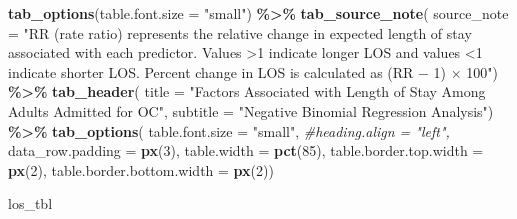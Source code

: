 \documentclass[
]{article}
\newenvironment{Shaded}{\begin{snugshade}}{\end{snugshade}}
\newcommand{\AttributeTok}[1]{\textcolor[rgb]{0.13,0.29,0.53}{#1}}
\newcommand{\CommentTok}[1]{\textcolor[rgb]{0.56,0.35,0.01}{\textit{#1}}}
\newcommand{\DecValTok}[1]{\textcolor[rgb]{0.00,0.00,0.81}{#1}}
\newcommand{\FunctionTok}[1]{\textcolor[rgb]{0.13,0.29,0.53}{\textbf{#1}}}
\newcommand{\NormalTok}[1]{#1}
\newcommand{\SpecialCharTok}[1]{\textcolor[rgb]{0.81,0.36,0.00}{\textbf{#1}}}
\newcommand{\StringTok}[1]{\textcolor[rgb]{0.31,0.60,0.02}{#1}}
\begin{document}
\begin{Shaded}
\begin{Highlighting}[]
  \FunctionTok{tab\_options}\NormalTok{(}\AttributeTok{table.font.size =} \StringTok{"small"}\NormalTok{) }\SpecialCharTok{\%\textgreater{}\%}
  \FunctionTok{tab\_source\_note}\NormalTok{(}
    \AttributeTok{source\_note =} \StringTok{"RR (rate ratio) represents the relative change in expected}
\StringTok{    length of stay associated with each predictor. Values \textgreater{}1 indicate longer }
\StringTok{    LOS and values \textless{}1 indicate shorter LOS. Percent change in LOS is calculated}
\StringTok{    as (RR − 1) × 100"}\NormalTok{) }\SpecialCharTok{\%\textgreater{}\%} 
  \FunctionTok{tab\_header}\NormalTok{(}
    \AttributeTok{title =} \StringTok{"Factors Associated with Length of Stay Among Adults Admitted for OC"}\NormalTok{,}
    \AttributeTok{subtitle =} \StringTok{"Negative Binomial Regression Analysis"}\NormalTok{) }\SpecialCharTok{\%\textgreater{}\%} 
  \FunctionTok{tab\_options}\NormalTok{(}
    \AttributeTok{table.font.size =} \StringTok{"small"}\NormalTok{,}
    \CommentTok{\#heading.align = "left",}
    \AttributeTok{data\_row.padding =} \FunctionTok{px}\NormalTok{(}\DecValTok{3}\NormalTok{),}
    \AttributeTok{table.width =} \FunctionTok{pct}\NormalTok{(}\DecValTok{85}\NormalTok{),}
    \AttributeTok{table.border.top.width =} \FunctionTok{px}\NormalTok{(}\DecValTok{2}\NormalTok{),}
    \AttributeTok{table.border.bottom.width =} \FunctionTok{px}\NormalTok{(}\DecValTok{2}\NormalTok{))}

\NormalTok{los\_tbl}
\end{Highlighting}
\end{Shaded}
\end{document}
